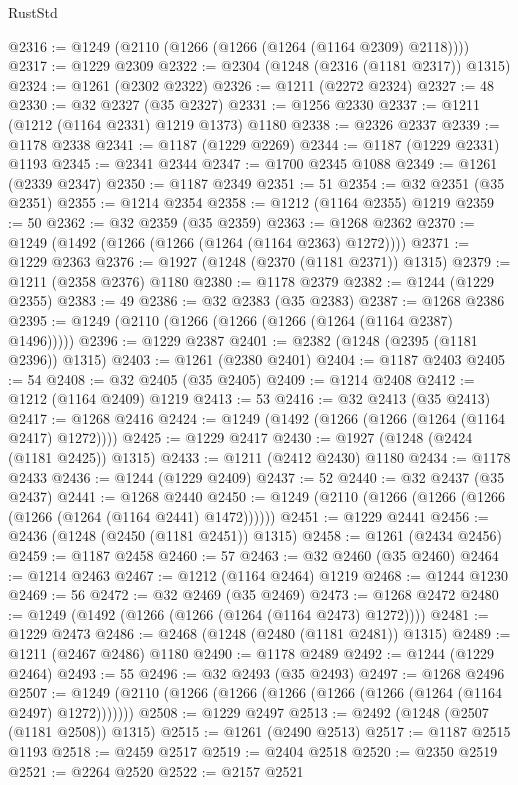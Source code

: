 \begin{lexlean}{RustStd}
\begin{coremodule}
@2316 := @1249 (@2110 (@1266 (@1266 (@1264 (@1164 @2309) @2118))))
@2317 := @1229 @2309
@2322 := @2304 (@1248 (@2316 (@1181 @2317)) @1315)
@2324 := @1261 (@2302 @2322)
@2326 := @1211 (@2272 @2324)
@2327 := 48
@2330 := @32 @2327 (@35 @2327)
@2331 := @1256 @2330
@2337 := @1211 (@1212 (@1164 @2331) @1219 @1373) @1180
@2338 := @2326 @2337
@2339 := @1178 @2338
@2341 := @1187 (@1229 @2269)
@2344 := @1187 (@1229 @2331) @1193
@2345 := @2341 @2344
@2347 := @1700 @2345 @1088
@2349 := @1261 (@2339 @2347)
@2350 := @1187 @2349
@2351 := 51
@2354 := @32 @2351 (@35 @2351)
@2355 := @1214 @2354
@2358 := @1212 (@1164 @2355) @1219
@2359 := 50
@2362 := @32 @2359 (@35 @2359)
@2363 := @1268 @2362
@2370 := @1249 (@1492 (@1266 (@1266 (@1264 (@1164 @2363) @1272))))
@2371 := @1229 @2363
@2376 := @1927 (@1248 (@2370 (@1181 @2371)) @1315)
@2379 := @1211 (@2358 @2376) @1180
@2380 := @1178 @2379
@2382 := @1244 (@1229 @2355)
@2383 := 49
@2386 := @32 @2383 (@35 @2383)
@2387 := @1268 @2386
@2395 := @1249 (@2110 (@1266 (@1266 (@1266 (@1264 (@1164 @2387) @1496)))))
@2396 := @1229 @2387
@2401 := @2382 (@1248 (@2395 (@1181 @2396)) @1315)
@2403 := @1261 (@2380 @2401)
@2404 := @1187 @2403
@2405 := 54
@2408 := @32 @2405 (@35 @2405)
@2409 := @1214 @2408
@2412 := @1212 (@1164 @2409) @1219
@2413 := 53
@2416 := @32 @2413 (@35 @2413)
@2417 := @1268 @2416
@2424 := @1249 (@1492 (@1266 (@1266 (@1264 (@1164 @2417) @1272))))
@2425 := @1229 @2417
@2430 := @1927 (@1248 (@2424 (@1181 @2425)) @1315)
@2433 := @1211 (@2412 @2430) @1180
@2434 := @1178 @2433
@2436 := @1244 (@1229 @2409)
@2437 := 52
@2440 := @32 @2437 (@35 @2437)
@2441 := @1268 @2440
@2450 := @1249 (@2110 (@1266 (@1266 (@1266 (@1266 (@1264 (@1164 @2441) @1472))))))
@2451 := @1229 @2441
@2456 := @2436 (@1248 (@2450 (@1181 @2451)) @1315)
@2458 := @1261 (@2434 @2456)
@2459 := @1187 @2458
@2460 := 57
@2463 := @32 @2460 (@35 @2460)
@2464 := @1214 @2463
@2467 := @1212 (@1164 @2464) @1219
@2468 := @1244 @1230
@2469 := 56
@2472 := @32 @2469 (@35 @2469)
@2473 := @1268 @2472
@2480 := @1249 (@1492 (@1266 (@1266 (@1264 (@1164 @2473) @1272))))
@2481 := @1229 @2473
@2486 := @2468 (@1248 (@2480 (@1181 @2481)) @1315)
@2489 := @1211 (@2467 @2486) @1180
@2490 := @1178 @2489
@2492 := @1244 (@1229 @2464)
@2493 := 55
@2496 := @32 @2493 (@35 @2493)
@2497 := @1268 @2496
@2507 := @1249 (@2110 (@1266 (@1266 (@1266 (@1266 (@1266 (@1264 (@1164 @2497) @1272)))))))
@2508 := @1229 @2497
@2513 := @2492 (@1248 (@2507 (@1181 @2508)) @1315)
@2515 := @1261 (@2490 @2513)
@2517 := @1187 @2515 @1193
@2518 := @2459 @2517
@2519 := @2404 @2518
@2520 := @2350 @2519
@2521 := @2264 @2520
@2522 := @2157 @2521

\end{coremodule}
\end{lexlean}
